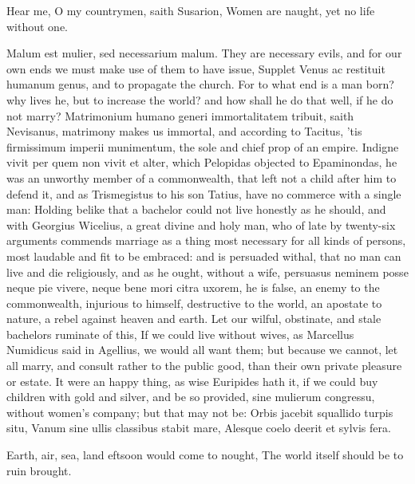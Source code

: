 {Hear me, O my countrymen, saith Susarion,
Women are naught, yet no life without one.

Malum est mulier, sed necessarium malum. They are necessary
evils, and for our own ends we must make use of them to have issue,
 Supplet Venus ac restituit humanum genus, and to propagate the
church. For to what end is a man born? why lives he, but to increase
the world? and how shall he do that well, if he do not marry?
Matrimonium humano generi immortalitatem tribuit, saith Nevisanus,
matrimony makes us immortal, and according to Tacitus, 'tis
firmissimum imperii munimentum, the sole and chief prop of an empire.
Indigne vivit per quem non vivit et alter, which Pelopidas
objected to Epaminondas, he was an unworthy member of a commonwealth,
that left not a child after him to defend it, and as Trismegistus
to his son Tatius, have no commerce with a single man: Holding belike
that a bachelor could not live honestly as he should, and with Georgius
Wicelius, a great divine and holy man, who of late by twenty-six
arguments commends marriage as a thing most necessary for all kinds of
persons, most laudable and fit to be embraced: and is persuaded withal,
that no man can live and die religiously, and as he ought, without a
wife, persuasus neminem posse neque pie vivere, neque bene mori citra
uxorem, he is false, an enemy to the commonwealth, injurious to
himself, destructive to the world, an apostate to nature, a rebel
against heaven and earth. Let our wilful, obstinate, and stale
bachelors ruminate of this, If we could live without wives, as
Marcellus Numidicus said in  Agellius, we would all want them;
but because we cannot, let all marry, and consult rather to the public
good, than their own private pleasure or estate. It were an happy
thing, as wise Euripides hath it, if we could buy children with
gold and silver, and be so provided, sine mulierum congressu, without
women's company; but that may not be:
Orbis jacebit squallido turpis situ,
Vanum sine ullis classibus stabit mare,
Alesque coelo deerit et sylvis fera.

Earth, air, sea, land eftsoon would come to nought,
The world itself should be to ruin brought.

}

